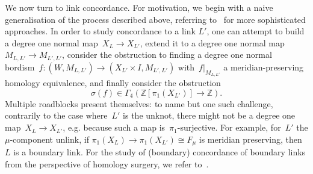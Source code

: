 \documentclass[10.9pt,a4paper]{amsart}
\theoremstyle{definition}
\theoremstyle{remark}
\newcommand{\Z}{\mathbb{Z}}
\begin{document}
%





We now turn to link concordance.
% 
For motivation, we begin with a naive generalisation of the process described above, referring to~\cite{LevineOrrSurvey,LeDimetThesis} for more sophisticated approaches.
In order to study concordance to a link $L'$,  one can attempt to build a degree one normal map~$X_L \to X_{L'}$,  extend it to a degree one normal map~$M_{L,L'} \to M_{L',L'}$,  consider the obstruction to finding a degree one normal bordism~$f \colon (W,M_{L,L'}) \to (X_{L'} \times I,M_{L',L'})$ with~$f|_{M_{L,L'}}$  a meridian-preserving homology equivalence,  and finally consider the obstruction 
$$\sigma(f) \in \Gamma_4(\Z[\pi_1(X_{L'})]\to \Z).$$
Multiple roadblocks present themselves: to name but one such challenge,  contrarily to the case where~$L'$ is the unknot, there might not be a degree one map~$X_L \to X_{L'}$, e.g. because such a map is~$\pi_1$-surjective.
For example,  for~$L'$ the $\mu$-component unlink, if $\pi_1(X_L) \to \pi_1(X_{L'}) \cong F_\mu$ is meridian preserving,  then~$L$ is a boundary link.
For the study of (boundary) concordance of boundary links from the perspective of homology surgery, we refer to~\cite{CappellShanesonLinkCobordism, Ko2,LeDimetThesis, SheihamThesis}.
\end{document}
